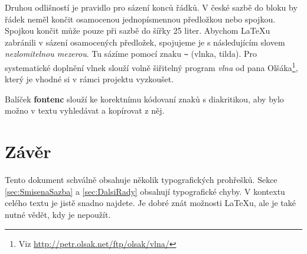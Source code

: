 \documentclass[10pt, a4paper, twocolumn]{article}
\begin{document}
Druhou odlišností je pravidlo pro sázení konců řádků.
V české sazbě do bloku by řádek neměl končit osamocenou jednopísmennou předložkou nebo spojkou.
Spojkou  končit může pouze při sazbě do šířky 25 liter.
Abychom \LaTeX u zabránili v sázení osamocených předložek, spojujeme je s následujícím slovem \emph{nezlomitelnou mezerou}.
Tu sázíme pomocí znaku \verb|~| (vlnka, tilda).
Pro systematické doplnění vlnek slouží volně šiřitelný program \emph{vlna} od pana Olšáka\footnote{Viz \url{http://petr.olsak.net/ftp/olsak/vlna/}}, který je vhodné si v rámci projektu vyzkoušet.

Balíček \textbf{fontenc} slouží ke korektnímu kódovaní znaků s diakritikou, aby bylo možno v textu vyhledávat a kopírovat z něj.

\section{Závěr}

Tento dokument schválně obsahuje několik typografických prohřešků.
Sekce \ref{sec:SmisenaSazba} a \ref{sec:DalsiRady} obsahují typografické chyby.
V kontextu celého textu je jistě snadno najdete.
Je dobré znát možnosti \LaTeX u, ale je také nutné vědět, kdy je nepoužít.
\end{document}
